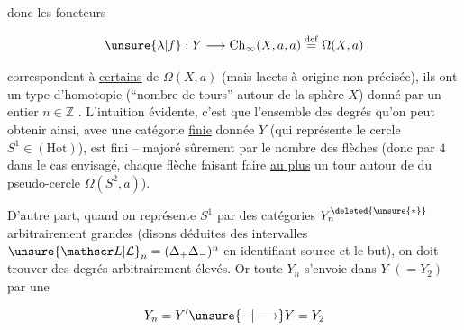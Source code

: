 
donc les foncteurs

\[
\unsure{\lambda|f}:Y\longrightarrow\mathrm{Ch}_\infty(X,a,a)\overset{\mathrm{def}}{=}\Omega(X,a)
\]

correspondent à \uline{certains}   de $\Omega(X,a)$ (mais lacets à origine non précisée), ils ont un type d'homotopie  (``nombre de tours'' autour de la sphère $X$) donné par un entier $n\in\mathbb Z$ . L'intuition évidente, c'est que l'ensemble des degrés \inserted{$\delta$} qu'on peut obtenir ainsi, avec une catégorie \uline{finie} donnée $Y$ (qui représente  le cercle $S^1\in(\mathrm{Hot})$), est fini -- \inserted{\unsure{$\lvert\delta\rvert$|!!}} majoré  sûrement par le nombre des  flèches (donc  par $4$ dans le cas envisagé, chaque flèche  faisant faire \uline{au plus} un tour autour de  du pseudo-cercle $\Omega(S^2,a)$).


D'autre part, quand on représente $S^1$ par des catégories $Y_n^{\deleted{\unsure{*}}}$  arbitrairement grandes (disons déduites des \deleted{\unsure{\Omega}} intervalles $\unsure{\mathscr L|\mathcal L}_n=(\Delta_+\Delta_-)^n$ en identifiant   source et le but), on doit trouver des degrés arbitrairement élevés. Or toute $Y_n$ s'envoie dans $Y$ $(=Y_2)$ par une  

\[
Y_n=Y'\unsure{-|\longrightarrow}Y=Y_2
\]

